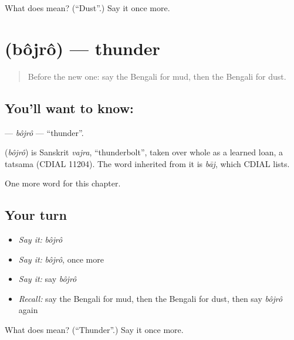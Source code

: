 \begin{tcolorbox}[breakable,colback=teal!4,colframe=teal!35!black,title={Before you move on}]
What does  mean? (\textquotedblleft{}Dust\textquotedblright{}.) Say it once more.
\end{tcolorbox}
\section[\texorpdfstring{\bn{বজ্র} (bôjrô)}{বজ্র (bôjrô)}]{ (bôjrô) — thunder}

\label{lesson:BN-C113-bojro}



\begin{quote}
Before the new one: say the Bengali for mud, then the Bengali for dust.
\end{quote}

\subsection*{You'll want to know: }
\textbf{} — \emph{bôjrô} — \textquotedblleft{}thunder\textquotedblright{}.

\begin{cousinweb}
\textbf{} (\emph{bôjrô}) is Sanskrit \emph{vajra}, \textquotedblleft{}thunderbolt\textquotedblright{}, taken over whole as a learned loan, a tatsama (CDIAL 11204). The word inherited from it is \emph{bāj}, which CDIAL lists.
\end{cousinweb}

\begin{grammarlens}[title={What you've built}]
One more word for this chapter.
\end{grammarlens}

\subsection*{Your turn}
\begin{itemize}
\raggedright
  \item \emph{Say it:} \emph{bôjrô}
  \item \emph{Say it:} \emph{bôjrô}, once more
  \item \emph{Say it:} say \emph{bôjrô}
  \item \emph{Recall:} say the Bengali for mud, then the Bengali for dust, then say \emph{bôjrô} again
\end{itemize}

\begin{tcolorbox}[breakable,colback=teal!4,colframe=teal!35!black,title={Before you move on}]
What does  mean? (\textquotedblleft{}Thunder\textquotedblright{}.) Say it once more.
\end{tcolorbox}
